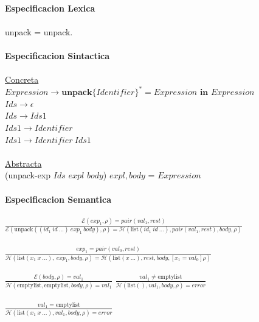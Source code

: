 \documentclass{article}
\begin{document}
\begin{itemize}
    \\
    \textbf{Especificacion Lexica}\\
    \\
    \hspace*{10mm} unpack = unpack.\\
    \\
    \textbf{Especificacion Sintactica}\\
    \\
    \hspace*{10mm} \underline{Concreta}\\
    \hspace*{10mm} $Expression\rightarrow\textbf{unpack}\{ Identifier \}^*=Expression\textbf{ in }Expression$\\
    \hspace*{10mm} $Ids\rightarrow\epsilon$\\
    \hspace*{10mm} $Ids\rightarrow Ids1$\\
    \hspace*{10mm} $Ids1\rightarrow Identifier$\\
    \hspace*{10mm} $Ids1\rightarrow Identifier\ Ids1$\\
    \\
    \hspace*{10mm} \underline{Abstracta}\\
    \hspace*{10mm} (unpack-exp $Ids$ $expl$ $body$)\hspace{10mm} $expl,body$ = $Expression$\\
    \\
    \textbf{Especificacion Semantica}\\
    \\
    \hspace*{10mm}
        $\frac
        {\mathcal{E}(exp_1,\rho)=pair(val_1,rest)}
        {\mathcal{E}(\text{unpack}((id_1\ id\ ...)\ exp_1\ body),\rho)=\mathcal{H}(\text{list}(id_1\ id\ ...),pair(val_1,rest),body,\rho)}$\\
    \\
    \hspace*{10mm}
        $\frac
        {exp_1=pair(val_0,rest)}
        {\mathcal{H}(\text{list}(x_1\ x\ ...),\ exp_1,body,\rho)=\mathcal{H}(\text{list}(x\ ...),rest,body,[x_1=val_0]\rho)}$\\
    \\
    \hspace*{10mm}
        $\frac
        {\mathcal{E}(body,\rho)=val_1}
        {\mathcal{H}(\text{emptylist},\text{emptylist},body,\rho)=val_1}$
    \hspace*{10mm}
        $\frac
        {   val_1\neq\text{emptylist}}
        {\mathcal{H}(\text{list}(),val_1,body,\rho)=error}$\\
    \\
    \hspace*{10mm}
        $\frac
        {   val_1=\text{emptylist}}
        {\mathcal{H}(\text{list}(x_1\ x\ ...),val_1,body,\rho)=error}$\\
    \\
    

\end{itemize}
\end{document}
